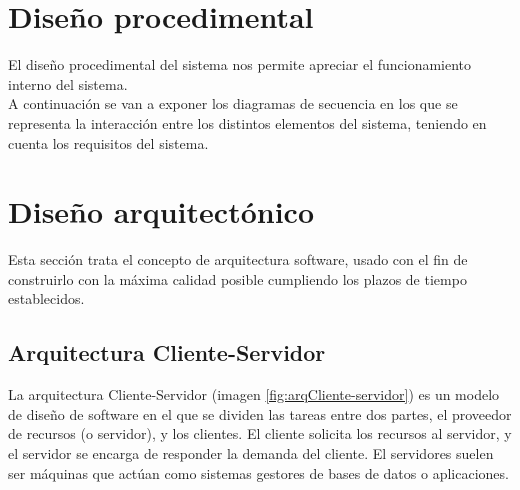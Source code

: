 \section{Diseño procedimental}

El diseño procedimental del sistema nos permite apreciar el funcionamiento interno del sistema.\\

A continuación se van a exponer los diagramas de secuencia en los que se representa la interacción entre los distintos elementos del sistema, teniendo en cuenta los requisitos del sistema.\\

\begin{landscape}
\end{landscape}



\section{Diseño arquitectónico}

Esta sección trata el concepto de arquitectura software, usado con el fin de construirlo con la máxima calidad posible cumpliendo los plazos de tiempo establecidos.

\subsection{Arquitectura Cliente-Servidor}

La arquitectura Cliente-Servidor (imagen \ref{fig:arqCliente-servidor}) es un modelo de diseño de software en el que se dividen las  tareas entre dos partes, el proveedor de recursos (o servidor), y los clientes. El cliente solicita los recursos al servidor, y el servidor se encarga de responder la demanda del cliente. El servidores suelen ser máquinas que actúan como sistemas gestores de bases de datos o aplicaciones.

